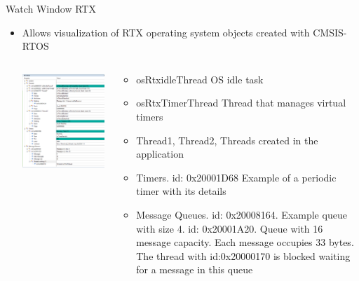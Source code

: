 \begin{frame}{Watch Window RTX}
    \begin{itemize}
        \item Allows visualization of RTX operating system objects created with CMSIS-RTOS
        \begin{columns}
            \begin{column}{0.50\textwidth}
            \includegraphics[scale=0.5]{presentation/watchwindowRTX.png}

            \end{column}
            \begin{column}{0.50\textwidth}
            \begin{itemize}
                \item osRtxidleThread OS idle task
                \item osRtxTimerThread Thread that manages virtual timers
                \item Thread1, Thread2, Threads created in the application
                \item Timers. id: 0x20001D68 Example of a periodic timer with its details
                \item Message Queues. id: 0x20008164. Example queue with size 4. id: 0x20001A20. Queue with 16 message capacity. Each message occupies 33 bytes. The thread with id:0x20000170 is blocked waiting for a message in this queue

            \end{itemize}
            \end{column}
        \end{columns}
    \end{itemize}
\end{frame}
